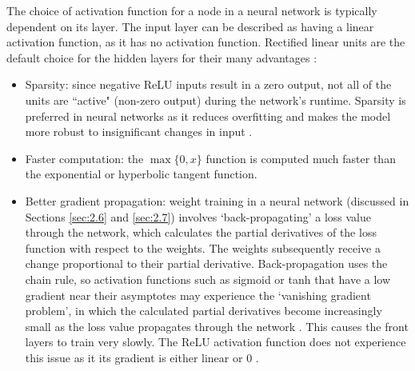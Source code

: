 \documentclass[honours,12pt, twoside]{unswthesis}
\numberwithin{equation}{section}
\theoremstyle{definition}
\begin{document}
The choice of activation function for a node in a neural network is typically dependent on its layer. The input layer can be described as having a linear activation function, as it has no activation function. Rectified linear units are the default choice for the hidden layers for their many advantages \citep{DeepLearning}:
\begin{itemize}
\item Sparsity: since negative ReLU inputs result in a zero output, not all of the units are ``active" (non-zero output) during the network's runtime. Sparsity is preferred in neural networks as it reduces overfitting and makes the model more robust to insignificant changes in input \citep{sparse}.
\item Faster computation: the $\max\{0,x\}$ function is computed much faster than the exponential or hyperbolic tangent function.
\item Better gradient propagation: weight training in a neural network (discussed in Sections \ref{sec:2.6} and \ref{sec:2.7}) involves `back-propagating' a loss value through the network, which calculates the partial derivatives of the loss function with respect to the weights. The weights subsequently receive a change proportional to their partial derivative. Back-propagation uses the chain rule, so activation functions such as sigmoid or tanh that have a low gradient near their asymptotes may experience the `vanishing gradient problem', in which the calculated partial derivatives become increasingly small as the loss value propagates through the network \citep{kolen}. This causes the front layers to train very slowly. The ReLU activation function does not experience this issue as it its gradient is either linear or $0$ \citep{sparse}.
\end{itemize}
\end{document}
